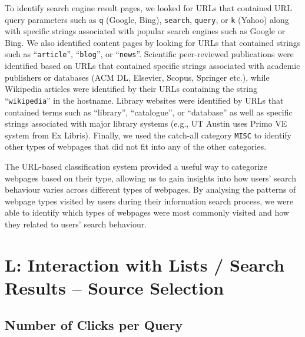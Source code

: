 \documentclass[letterpaper, nobind]{templates/ociamthesis}
\begin{document}
To identify search engine result pages, we looked for URLs that contained URL query parameters such as \texttt{q} (Google, Bing), \texttt{search}, \texttt{query}, or \texttt{k} (Yahoo) along with specific strings associated with popular search engines such as Google or Bing.
We also identified content pages by looking for URLs that contained strings such as ``\texttt{article}'', ``\texttt{blog}'', or ``\texttt{news}''.
Scientific peer-reviewed publications were identified based on URLs that contained specific strings associated with academic publishers or databases (ACM DL, Elsevier, Scopus, Springer etc.), while Wikipedia articles were identified by their URLs containing the string ``\texttt{wikipedia}'' in the hostname.
Library websites were identified by URLs that contained terms such as ``library'', ``catalogue'', or ``database'' as well as specific strings associated with major library systems (e.g., UT Austin uses Primo VE system from Ex Libris). Finally, we used the catch-all category \texttt{MISC} to identify other types of webpages that did not fit into any of the other categories.

The URL-based classification system provided a useful way to categorize webpages based on their type, allowing us to gain insights into how users' search behaviour varies across different types of webpages. By analysing the patterns of webpage types visited by users during their information search process, we were able to identify which types of webpages were most commonly visited and how they related to users' search behaviour.

\hypertarget{l-interaction-with-lists-search-results-source-selection}{%
\section{L: Interaction with Lists / Search Results -- Source Selection}\label{l-interaction-with-lists-search-results-source-selection}}

\hypertarget{number-of-clicks-per-query}{%
\subsection{Number of Clicks per Query}\label{number-of-clicks-per-query}}
\end{document}
